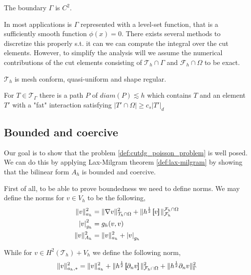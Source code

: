\begin{assumption}[G1]
    \label{as:G1}
    The boundary $\Gamma $ is $C^{2}$.
\end{assumption}

\begin{remark}
In most applications is $\Gamma $ represented with a level-set function, that is a sufficiently smooth function $\phi ( x)  = 0$. There exists several methods to discretize this properly s.t. it can we can compute the integral over the cut elements.
    However, to simplify the analysis will we assume the numerical contributions of the cut elements consisting of $\mathcal{T}_{h} \cap \Gamma   $ and $\mathcal{F}_{h} \cap \Omega  $ to be exact.
\end{remark}


\begin{assumption}[G1]
    $\mathcal{T}_{h} $ is mesh conform, quasi-uniform and shape regular.
\end{assumption}

\begin{assumption}[G3]
    For $T \in \mathcal{T} _{\Gamma   }$ there is a path $P$ of $diam(P) \lesssim h$ which contains $T$ and an element $T'$ with a "fat" interaction satisfying $\left\lvert T' \cap \Omega  \right\rvert \ge c_{s} \left\lvert T'  \right\rvert _{d}$
\end{assumption}


\subsection{Bounded and coercive}%
\label{sub:norms}

Our goal is to show that the problem \ref{def:cutdg_poisson_problem} is well posed. We can do this by applying Lax-Milgram theorem \ref{def:lax-milgram} by showing that the bilinear form $A_{h}$ is bounded and coercive.

First of all, to be able to prove boundedness we need to define norms.
We may define the norms for $v \in V_{h}$ to be the following,
\[
\begin{split}
    \| v \|_{ a_{h} }^{ 2 }  & = \| \nabla v \|_{ \mathcal{T} _{h} \cap \Omega  }^{ 2 } + \| h^{\frac{1}{2}} \left[\!\!\left[  v  \right]\!\!\right]   \|_{ \mathcal{F} _{h} }^{ \mathcal{F} _{h} \cap \Omega   } \\
    \left\lvert v \right\rvert _{g_{h}}^{2} & = g_{h}( v,v)  \\
    \| v \|_{ A_{h} }^{ 2 } &= \| v \|_{ a_{h} }^{ 2 } + \left\lvert v \right\rvert_{g_{h}}     \\
\end{split}
\]

While for $v \in H^2( \mathcal{T} _{h}) + V_{h}$ we define the following norm,\[
\| v \|_{ a_{h},* }^{ 2 } = \| v \|_{ a_{h} }^{ 2 } +   \| h^{\frac{1}{2}} \left[\!\!\left[  \partial _{n} v  \right]\!\!\right]    \|_{  \mathcal{F} _{h} \cap \Omega }^{  2} + \| h^{\frac{1}{2}} \partial _{n} v \|_{ \Gamma  }^{ 2 }
\]





